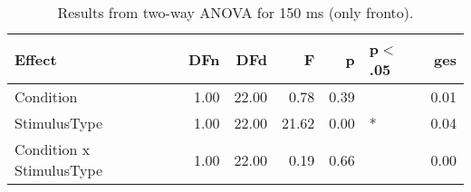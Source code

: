 \begin{table}[ht]
\centering
\begin{tabulary}{\textwidth}{lrrrrlr}
  \toprule
Effect & DFn & DFd & F & p & p$<$.05 & ges \\ 
  \midrule
Condition & 1.00 & 22.00 & 0.78 & 0.39 &  & 0.01 \\ 
  StimulusType & 1.00 & 22.00 & 21.62 & 0.00 & * & 0.04 \\ 
  Condition x StimulusType & 1.00 & 22.00 & 0.19 & 0.66 &  & 0.00 \\ 
   \bottomrule
\end{tabulary}
\caption{Results from two-way ANOVA for 150 ms (only fronto).} 
\end{table}
